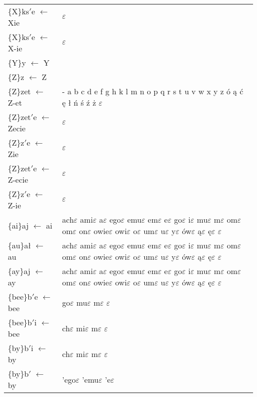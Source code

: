 \documentclass{article}
\begin{document}
\begin{longtable}{l|p{10cm}}
\{X\}ks$'$e $\leftarrow$ Xie & $\varepsilon$\\
\{X\}ks$'$e $\leftarrow$ X-ie & $\varepsilon$\\
\{Y\}y $\leftarrow$ Y & \\
\{Z\}z $\leftarrow$ Z & \\
\{Z\}zet $\leftarrow$ Z-et & - a b c d e f g h k l m n o p q r s t u v w x y z ó ą ć ę ł ń ś ź ż $\varepsilon$\\
\{Z\}zet$'$e $\leftarrow$ Zecie & $\varepsilon$\\
\{Z\}z$'$e $\leftarrow$ Zie & $\varepsilon$\\
\{Z\}zet$'$e $\leftarrow$ Z-ecie & $\varepsilon$\\
\{Z\}z$'$e $\leftarrow$ Z-ie & $\varepsilon$\\
\{ai\}aj $\leftarrow$ ai & ach$\varepsilon$ ami$\varepsilon$ a$\varepsilon$ ego$\varepsilon$ emu$\varepsilon$ em$\varepsilon$ e$\varepsilon$ go$\varepsilon$ i$\varepsilon$ mu$\varepsilon$ m$\varepsilon$ om$\varepsilon$ om$\varepsilon$ on$\varepsilon$ owie$\varepsilon$ owi$\varepsilon$ o$\varepsilon$ um$\varepsilon$ u$\varepsilon$ y$\varepsilon$ ów$\varepsilon$ ą$\varepsilon$ ę$\varepsilon$ $\varepsilon$\\
\{au\}ał $\leftarrow$ au & ach$\varepsilon$ ami$\varepsilon$ a$\varepsilon$ ego$\varepsilon$ emu$\varepsilon$ em$\varepsilon$ e$\varepsilon$ go$\varepsilon$ i$\varepsilon$ mu$\varepsilon$ m$\varepsilon$ om$\varepsilon$ om$\varepsilon$ on$\varepsilon$ owie$\varepsilon$ owi$\varepsilon$ o$\varepsilon$ um$\varepsilon$ u$\varepsilon$ y$\varepsilon$ ów$\varepsilon$ ą$\varepsilon$ ę$\varepsilon$ $\varepsilon$\\
\{ay\}aj $\leftarrow$ ay & ach$\varepsilon$ ami$\varepsilon$ a$\varepsilon$ ego$\varepsilon$ emu$\varepsilon$ em$\varepsilon$ e$\varepsilon$ go$\varepsilon$ i$\varepsilon$ mu$\varepsilon$ m$\varepsilon$ om$\varepsilon$ om$\varepsilon$ on$\varepsilon$ owie$\varepsilon$ owi$\varepsilon$ o$\varepsilon$ um$\varepsilon$ u$\varepsilon$ y$\varepsilon$ ów$\varepsilon$ ą$\varepsilon$ ę$\varepsilon$ $\varepsilon$\\
\{bee\}b$'$e $\leftarrow$ bee & go$\varepsilon$ mu$\varepsilon$ m$\varepsilon$ $\varepsilon$\\
\{bee\}b$'$i $\leftarrow$ bee & ch$\varepsilon$ mi$\varepsilon$ m$\varepsilon$ $\varepsilon$\\
\{by\}b$'$i $\leftarrow$ by & ch$\varepsilon$ mi$\varepsilon$ m$\varepsilon$ $\varepsilon$\\
\{by\}b$'$ $\leftarrow$ by & ’ego$\varepsilon$ ’emu$\varepsilon$ ’e$\varepsilon$\\

\end{longtable}
\end{document}
